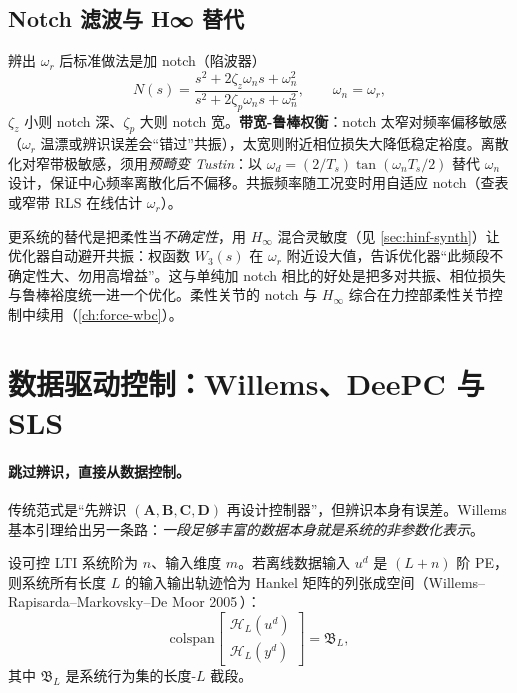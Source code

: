 \subsection{Notch 滤波与 H∞ 替代}
辨出 $\omega_r$ 后标准做法是加 notch（陷波器）
\begin{equation}
  N(s)=\frac{s^2+2\zeta_z\omega_n s+\omega_n^2}{s^2+2\zeta_p\omega_n s+\omega_n^2},\qquad \omega_n=\omega_r,
\end{equation}
$\zeta_z$ 小则 notch 深、$\zeta_p$ 大则 notch 宽。\textbf{带宽-鲁棒权衡}：notch 太窄对频率偏移敏感（$\omega_r$ 温漂或辨识误差会“错过”共振），太宽则附近相位损失大降低稳定裕度。离散化对窄带极敏感，须用\emph{预畸变 Tustin}：以 $\omega_d=(2/T_s)\tan(\omega_n T_s/2)$ 替代 $\omega_n$ 设计，保证中心频率离散化后不偏移。共振频率随工况变时用自适应 notch（查表或窄带 RLS 在线估计 $\omega_r$）。

更系统的替代是把柔性当\emph{不确定性}，用 $H_\infty$ 混合灵敏度（见 \cref{sec:hinf-synth}）让优化器自动避开共振：权函数 $W_3(s)$ 在 $\omega_r$ 附近设大值，告诉优化器“此频段不确定性大、勿用高增益”。这与单纯加 notch 相比的好处是把多对共振、相位损失与鲁棒裕度统一进一个优化。柔性关节的 notch 与 $H_\infty$ 综合在力控部柔性关节控制中续用（\cref{ch:force-wbc}）。

\section{数据驱动控制：Willems、DeePC 与 SLS}
\label{sec:data-driven}

\paragraph{跳过辨识，直接从数据控制。}
传统范式是“先辨识 $(\mathbf A,\mathbf B,\mathbf C,\mathbf D)$ 再设计控制器”，但辨识本身有误差。Willems 基本引理给出另一条路：\emph{一段足够丰富的数据本身就是系统的非参数化表示}。

\begin{theorem}
\label{thm:willems}
设可控 LTI 系统阶为 $n$、输入维度 $m$。若离线数据输入 $u^d$ 是 $(L+n)$ 阶 PE，则系统所有长度 $L$ 的输入输出轨迹恰为 Hankel 矩阵的列张成空间（Willems--Rapisarda--Markovsky--De Moor 2005\,\cite{willems2005persistency}）：
\begin{equation}
  \mathrm{colspan}\begin{bmatrix}\mathcal H_L(u^d)\\\mathcal H_L(y^d)\end{bmatrix}=\mathfrak B_L,
\end{equation}
其中 $\mathfrak B_L$ 是系统行为集的长度-$L$ 截段。
\end{theorem}

